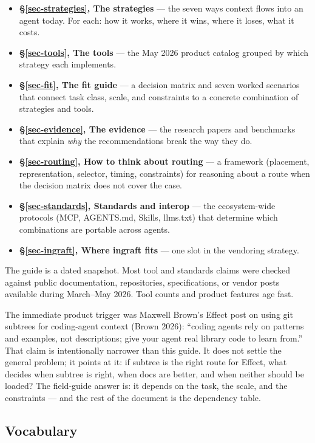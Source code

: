 \documentclass[
  11pt,
  letterpaper,
  numbers=noendperiod,
  parskip=half]{scrartcl}
\providecommand{\tightlist}{%
  \setlength{\itemsep}{0pt}\setlength{\parskip}{0pt}}
\begin{document}
\begin{itemize}
\tightlist
\item
  \textbf{\S\ref{sec-strategies}, The strategies} --- the seven ways
  context flows into an agent today. For each: how it works, where it
  wins, where it loses, what it costs.
\item
  \textbf{\S\ref{sec-tools}, The tools} --- the May 2026 product catalog
  grouped by which strategy each implements.
\item
  \textbf{\S\ref{sec-fit}, The fit guide} --- a decision matrix and
  seven worked scenarios that connect task class, scale, and
  constraints to a concrete combination of strategies and tools.
\item
  \textbf{\S\ref{sec-evidence}, The evidence} --- the research papers
  and benchmarks that explain \emph{why} the recommendations break the
  way they do.
\item
  \textbf{\S\ref{sec-routing}, How to think about routing} --- a
  framework (placement, representation, selector, timing, constraints)
  for reasoning about a route when the decision matrix does not cover
  the case.
\item
  \textbf{\S\ref{sec-standards}, Standards and interop} --- the
  ecosystem-wide protocols (MCP, AGENTS.md, Skills, llms.txt) that
  determine which combinations are portable across agents.
\item
  \textbf{\S\ref{sec-ingraft}, Where ingraft fits} --- one slot in the
  vendoring strategy.
\end{itemize}

The guide is a dated snapshot. Most tool and standards claims were
checked against public documentation, repositories, specifications, or
vendor posts available during March--May 2026. Tool counts and product
features age fast.

The immediate product trigger was Maxwell Brown's Effect post on using
git subtrees for coding-agent context (Brown 2026): ``coding agents
rely on patterns and examples, not descriptions; give your agent real
library code to learn from.'' That claim is intentionally narrower than
this guide. It does not settle the general problem; it points at it: if
subtree is the right route for Effect, what decides when subtree is
right, when docs are better, and when neither should be loaded? The
field-guide answer is: it depends on the task, the scale, and the
constraints --- and the rest of the document is the dependency table.

\subsection{Vocabulary}\label{sec-vocabulary}
\end{document}
